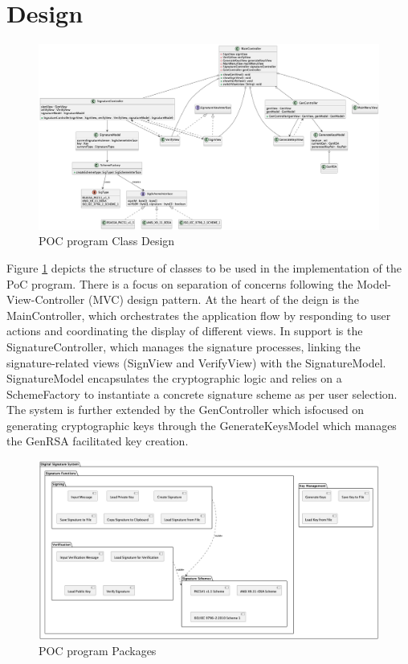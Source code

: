 \documentclass[]{final_report}
\theoremstyle{definition}
\begin{document}
\section{Design}


\begin{landscape}
\thispagestyle{lscape} %
\begin{figure}[H]
    \centering
    \includegraphics[width=\linewidth,keepaspectratio]{POC.png}
    \caption{POC program Class Design}
    \label{fig:POCCLASSES}
\end{figure}
\end{landscape}
Figure \ref{fig:POCCLASSES} depicts the structure of classes to be used in the implementation of the PoC program.  There is a focus on separation of concerns following the Model-View-Controller (MVC) design pattern. At the heart of the deign is the MainController, which orchestrates the application flow by responding to user actions and coordinating the display of different views. In support is the SignatureController, which manages the signature processes, linking the signature-related views (SignView and VerifyView) with the SignatureModel. SignatureModel encapsulates the cryptographic logic and relies on a SchemeFactory to instantiate a concrete signature scheme as per user selection. The system is further extended by the GenController which isfocused on generating cryptographic keys through the GenerateKeysModel which manages the GenRSA facilitated key creation.
\begin{figure}[H]
    \centering
    \includegraphics[scale=0.31]{package.png}
    \caption{POC program Packages}
    \label{fig:pack}
\end{figure}
\end{document}
